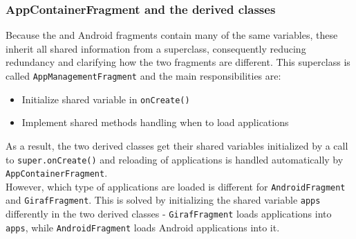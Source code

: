 

 

\subsubsection{AppContainerFragment and the derived classes}

Because the \giraf and Android fragments contain many of the same variables, these inherit all shared information from a superclass, consequently reducing redundancy and clarifying how the two fragments are different.
This superclass is called \lstinline!AppManagementFragment! and the main responsibilities are:

\begin{itemize}
\item Initialize shared variable in \lstinline!onCreate()!
\item Implement shared methods handling when to load applications
\end{itemize}

As a result, the two derived classes get their shared variables initialized by a call to \lstinline!super.onCreate()! and reloading of applications is handled automatically by \lstinline!AppContainerFragment!. \\

However, which type of applications are loaded is different for \lstinline!AndroidFragment! and \lstinline!GirafFragment!.
This is solved by initializing the shared variable \lstinline!apps! differently in the two derived classes -
\lstinline!GirafFragment! loads \giraf applications into \lstinline!apps!, while \lstinline!AndroidFragment! loads Android applications into it.

